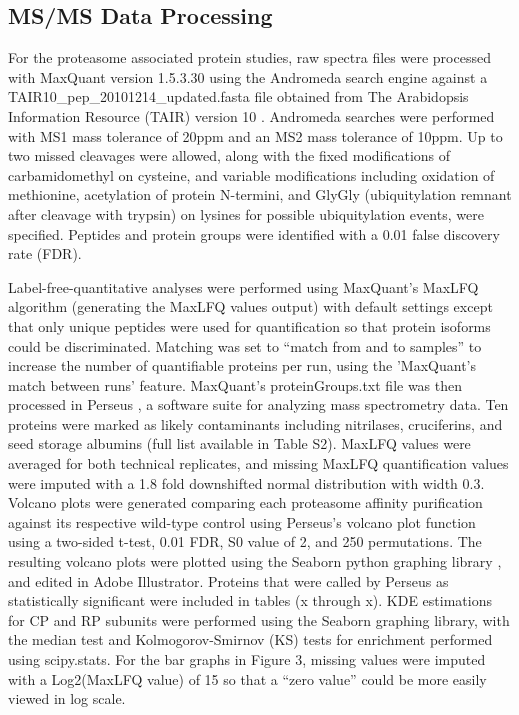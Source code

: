\subsection{MS/MS Data Processing}
	For the proteasome associated protein studies, raw spectra files were processed with MaxQuant version 1.5.3.30 \citep{cox08} using the Andromeda search engine against a TAIR10\_pep\_20101214\_updated.fasta file obtained from The Arabidopsis Information Resource (TAIR) version 10 . Andromeda searches were performed with MS1 mass tolerance of 20ppm and an MS2 mass tolerance of 10ppm. Up to two missed cleavages were allowed, along with the fixed modifications of carbamidomethyl on cysteine, and variable modifications including oxidation of methionine, acetylation of protein N-termini, and GlyGly (ubiquitylation remnant after cleavage with trypsin) on lysines for possible ubiquitylation events, were specified. Peptides and protein groups were identified with a 0.01 false discovery rate (FDR). 

	Label-free-quantitative analyses were performed using MaxQuant’s MaxLFQ \citep{cox14} algorithm (generating the MaxLFQ values output) with default settings except that only unique peptides were used for quantification so that protein isoforms could be discriminated.  Matching was set to “match from and to samples” to increase the number of quantifiable proteins per run, using the 'MaxQuant’s match between runs' feature. MaxQuant’s proteinGroups.txt file was then processed in Perseus \citep{tyanova16}, a software suite for analyzing mass spectrometry data. Ten proteins were marked as likely contaminants including nitrilases, cruciferins, and seed storage albumins (full list available in Table S2). MaxLFQ values were averaged for both technical replicates, and missing MaxLFQ quantification values were imputed with a 1.8 fold downshifted normal distribution with width 0.3. Volcano plots were generated comparing each proteasome affinity purification against its respective wild-type control using Perseus’s volcano plot function using a two-sided t-test, 0.01 FDR, S0 value of 2, and 250 permutations. The resulting volcano plots were plotted using the Seaborn python graphing library \citep{tyanova16, waskom16}, and edited in Adobe Illustrator. Proteins that were called by Perseus as statistically significant were included in tables (x through x). KDE estimations for CP and RP subunits were performed using the Seaborn graphing library, with the median test and Kolmogorov-Smirnov (KS) tests for enrichment performed using scipy.stats. For the bar graphs in Figure 3, missing values were imputed with a Log2(MaxLFQ value) of 15 so that a “zero value” could be more easily viewed in log scale.

